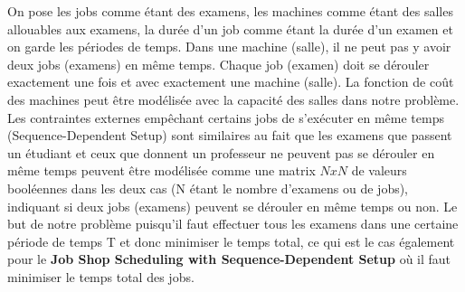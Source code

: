 \documentclass[a4paper,11pt]{article}
\begin{document}
On pose les jobs comme étant des examens, les machines comme étant des salles allouables aux examens, la durée d'un job comme étant la durée d'un examen et on garde les périodes de temps. Dans une machine (salle), il ne peut pas y avoir deux jobs (examens) en même temps. Chaque job (examen) doit se dérouler exactement une fois et avec exactement une machine (salle).
La fonction de coût des machines peut être modélisée avec la capacité des salles dans notre problème.
Les contraintes externes empêchant certains jobs de s'exécuter en même temps (Sequence-Dependent Setup) sont similaires au fait que les examens que passent un étudiant et ceux que donnent un professeur ne peuvent pas se dérouler en même temps peuvent être modélisée comme une matrix $ N x N $ de valeurs booléennes dans les deux cas (N étant le nombre d'examens ou de jobs), indiquant si deux jobs (examens) peuvent se dérouler en même temps ou non.
Le but de notre problème puisqu'il faut effectuer tous les examens dans une certaine période de temps T et donc minimiser le temps total, ce qui est le cas également pour le \textbf{Job Shop Scheduling with Sequence-Dependent Setup} où il faut minimiser le temps total des jobs.
\end{document}
